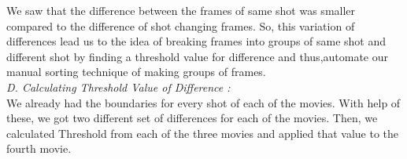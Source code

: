 \documentclass[twocolumn,twoside]{article}
\begin{document}
 We saw that the difference between the frames of same shot was smaller compared to the difference of shot changing frames. So, this variation of differences lead us to the idea of breaking frames into groups of same shot and different shot by finding a threshold value for difference and thus,automate our manual sorting technique of making groups of frames.\\

		\vspace{0.4cm}
		\textit{D. Calculating Threshold Value of Difference :}\\ 
		
	We already had the boundaries for every shot of each of the movies. With help of these, we got two different set of differences for each of the movies. Then, we calculated Threshold from each of the three movies and applied that value to the fourth movie.\\
		
\end{document}
